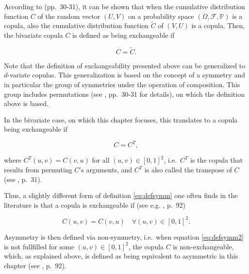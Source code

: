 \documentclass[
]{krantz}
\begin{document}
According to \citet{durante2016} (pp.~30-31), it can be shown that when the cumulative distribution function \(C\) of the random vector \((U,V)\) on a probability space \((\Omega, \mathcal{F}, \mathbb{P})\) is a copula, also the cumulative distribution function \(\tilde{C}\) of \((V,U)\) is a copula. Then, the bivariate copula \(C\) is defined as being exchangeable if

\begin{equation}
C=\tilde{C}.
\label{eq:defsymmgen}
\end{equation}

Note that the definition of exchangeability presented above can be generalized to \(d\)-variate copulas. This generalization is based on the concept of a symmetry and in particular the group of symmetries under the operation of composition. This group includes permutations (see \citet{durante2016}, pp.~30-31 for details), on which the definition above is based.

In the bivariate case, on which this chapter focuses, this translates to a copula being exchangeable if

\begin{equation}
C=C^T,
\label{eq:defsymm}
\end{equation}

where \(C^T(u,v) = C(v,u)\) for all \((u,v) \in [0,1]^2\), i.e.~\(C^T\) is the copula that results from permuting \(C\)'s arguments, and \(C^T\) is also called the transpose of \(C\) (see \citet{durante2016}, p.~31).

Thus, a slightly different form of definition \eqref{eq:defsymm} one often finds in the literature is that a copula is exchangeable if (see e.g. \citet{genest2013}, p.~92)

\begin{equation}
C(u,v)=C(v,u) \quad \forall (u,v) \in [0,1]^2.
\label{eq:defsymm2}
\end{equation}

Asymmetry is then defined via non-symmetry, i.e.~when equation \eqref{eq:defsymm2} is not fullfilled for some \((u,v) \in [0,1]^2\), the copula \(C\) is non-exchangeable, which, as explained above, is defined as being equivalent to asymmetric in this chapter (see \citet{genest2013}, p.~92).
\end{document}
